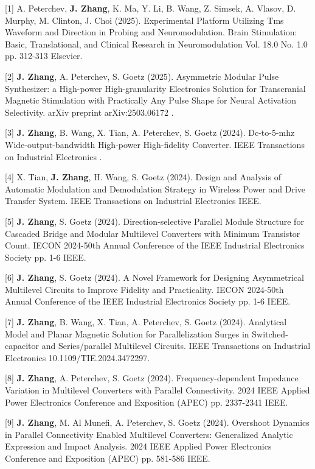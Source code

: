 [1] A. Peterchev, \textbf{J. Zhang}, K. Ma, Y. Li, B. Wang, Z. Simsek, A. Vlasov, D. Murphy, M. Clinton, J. Choi (2025). Experimental Platform Utilizing Tms Waveform and Direction in Probing and Neuromodulation. Brain Stimulation: Basic, Translational, and Clinical Research in Neuromodulation Vol. 18.0 No. 1.0 pp. 312-313 Elsevier.

[2] \textbf{J. Zhang}, A. Peterchev, S. Goetz (2025). Asymmetric Modular Pulse Synthesizer: a High-power High-granularity Electronics Solution for Transcranial Magnetic Stimulation with Practically Any Pulse Shape for Neural Activation Selectivity. arXiv preprint arXiv:2503.06172    .

[3] \textbf{J. Zhang}, B. Wang, X. Tian, A. Peterchev, S. Goetz (2024). Dc-to-5-mhz Wide-output-bandwidth High-power High-fidelity Converter. IEEE Transactions on Industrial Electronics    .

[4] X. Tian, \textbf{J. Zhang}, H. Wang, S. Goetz (2024). Design and Analysis of Automatic Modulation and Demodulation Strategy in Wireless Power and Drive Transfer System. IEEE Transactions on Industrial Electronics    IEEE.

[5] \textbf{J. Zhang}, S. Goetz (2024). Direction-selective Parallel Module Structure for Cascaded Bridge and Modular Multilevel Converters with Minimum Transistor Count. IECON 2024-50th Annual Conference of the IEEE Industrial Electronics Society   pp. 1-6 IEEE.

[6] \textbf{J. Zhang}, S. Goetz (2024). A Novel Framework for Designing Asymmetrical Multilevel Circuits to Improve Fidelity and Practicality. IECON 2024-50th Annual Conference of the IEEE Industrial Electronics Society   pp. 1-6 IEEE.

[7] \textbf{J. Zhang}, B. Wang, X. Tian, A. Peterchev, S. Goetz (2024). Analytical Model and Planar Magnetic Solution for Parallelization Surges in Switched-capacitor and Series/parallel Multilevel Circuits. IEEE Transactions on Industrial Electronics    10.1109/TIE.2024.3472297.

[8] \textbf{J. Zhang}, A. Peterchev, S. Goetz (2024). Frequency-dependent Impedance Variation in Multilevel Converters with Parallel Connectivity. 2024 IEEE Applied Power Electronics Conference and Exposition (APEC)   pp. 2337-2341 IEEE.

[9] \textbf{J. Zhang}, M. Al Munefi, A. Peterchev, S. Goetz (2024). Overshoot Dynamics in Parallel Connectivity Enabled Multilevel Converters: Generalized Analytic Expression and Impact Analysis. 2024 IEEE Applied Power Electronics Conference and Exposition (APEC)   pp. 581-586 IEEE.


